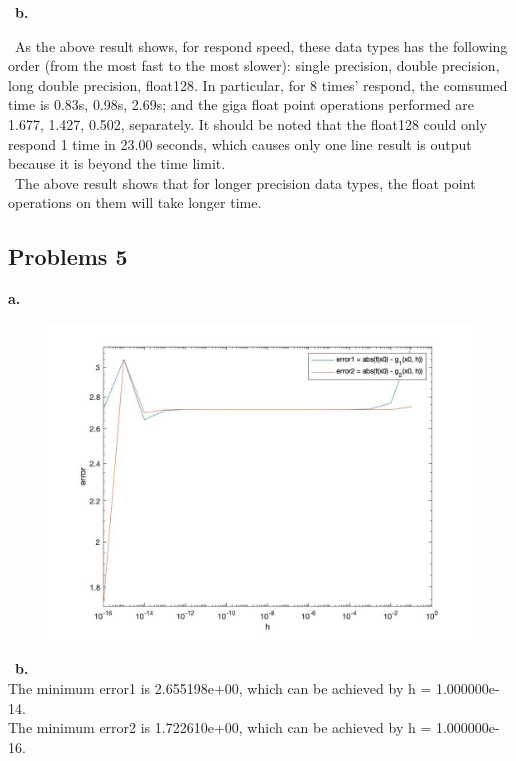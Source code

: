\documentclass[11pt,fleqn]{exam}
\newcommand{\nn}{~\newline \noindent }
\begin{document}
\nn \textbf{b.}

\nn As the above result shows,  for respond speed, these data types has the following order (from the most fast to the most slower): single precision, double precision, long double precision, float128. In particular, for 8 times' respond, the comsumed time is 0.83s, 0.98s, 2.69s; and the giga float point operations performed are 1.677, 1.427, 0.502, separately. It should be noted that the float128 could only respond 1 time in 23.00 seconds, which causes only one line result is output because it is beyond the time limit.\\
\nn The above result shows that for longer precision data types, the float point operations on them will take longer time.

\newpage
\subsection*{Problems 5}
\textbf{a.}\\
\begin{figure}[hbt!]
  	\centering
  	\includegraphics[width=1.0\textwidth]{loglog}
	\end{figure}

\nn \textbf{b.}\\
The minimum error1 is 2.655198e+00, which can be achieved by h = 1.000000e-14.\\
The minimum error2 is 1.722610e+00, which can be achieved by h = 1.000000e-16.
\end{document}
